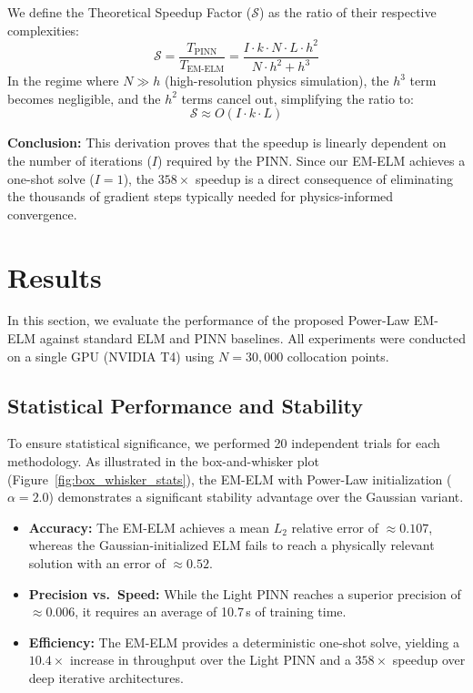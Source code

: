\documentclass[final,12pt,3p,times,fleqn]{elsarticle}
\begin{document}
We define the Theoretical Speedup Factor ($\mathcal{S}$) as the ratio of their respective complexities:
$$\mathcal{S} = \frac{T_{\text{PINN}}}{T_{\text{EM-ELM}}} = \frac{I \cdot k \cdot N \cdot L \cdot h^2}{N \cdot h^2 + h^3}$$
In the regime where $N \gg h$ (high-resolution physics simulation), the $h^3$ term becomes negligible, and the $h^2$ terms cancel out, simplifying the ratio to:
$$\mathcal{S} \approx O(I \cdot k \cdot L)$$

\textbf{Conclusion:} This derivation proves that the speedup is linearly dependent on the number of iterations ($I$) required by the PINN. Since our EM-ELM achieves a one-shot solve ($I=1$), the $358\times$ speedup is a direct consequence of eliminating the thousands of gradient steps typically needed for physics-informed convergence.


\section{Results}
In this section, we evaluate the performance of the proposed Power-Law EM-ELM against standard ELM and PINN baselines. All experiments were conducted on a single GPU (NVIDIA T4) using $N=30{,}000$ collocation points.

\subsection{Statistical Performance and Stability}

To ensure statistical significance, we performed 20 independent trials for each methodology. As illustrated in the box-and-whisker plot (Figure~\ref{fig:box_whisker_stats}), the EM-ELM with Power-Law initialization ($\alpha=2.0$) demonstrates a significant stability advantage over the Gaussian variant.
\begin{itemize}
    \item \textbf{Accuracy:} The EM-ELM achieves a mean $L_2$ relative error of $\approx 0.107$, whereas the Gaussian-initialized ELM fails to reach a physically relevant solution with an error of $\approx 0.52$.
    \item \textbf{Precision vs.\ Speed:} While the Light PINN reaches a superior precision of $\approx 0.006$, it requires an average of 10.7\,s of training time.
    \item \textbf{Efficiency:} The EM-ELM provides a deterministic one-shot solve, yielding a $10.4\times$ increase in throughput over the Light PINN and a $358\times$ speedup over deep iterative architectures.
\end{itemize}
\end{document}
